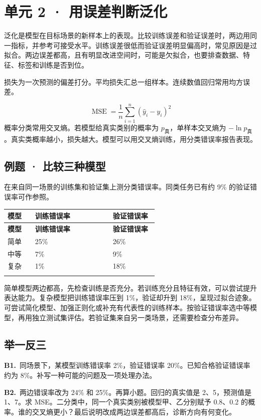 \documentclass[UTF8,a4paper,11pt]{ctexart}
\newcommand{\CompactQuestion}[2]{\par\noindent\textbf{#1.}\ #2\par\vspace{.8em}}
\begin{document}
\section{单元 2 · 用误差判断泛化}
泛化是模型在目标场景的新样本上的表现。比较训练误差和验证误差时，两边用同一指标，并参考可接受水平。训练误差很低而验证误差明显偏高时，常见原因是过拟合。两边误差都高，且有明显改进空间时，可能是欠拟合，也要排查数据、特征、标签和训练是否到位。

损失为一次预测的偏差打分。平均损失汇总一组样本。连续数值回归常用均方误差。

\[\operatorname{MSE}=\frac{1}{n}\sum_{i=1}^n(\hat y_i-y_i)^2\]
概率分类常用交叉熵。若模型给真实类别的概率为 $p_{\text{真}}$，单样本交叉熵为 $-\ln p_{\text{真}}$。真实类概率越小，损失越大。模型可以用交叉熵训练，用分类错误率报告表现。

\subsection{例题 · 比较三种模型}
在来自同一场景的训练集和验证集上测分类错误率。同类任务已有约 9\% 的验证错误率可作参照。

{\small\renewcommand{\arraystretch}{1.38}\setlength{\tabcolsep}{3.5pt}
\begin{longtable}{P{0.17\linewidth}P{0.48\linewidth}P{0.28\linewidth}}
\toprule
\bfseries 模型 & \bfseries 训练错误率 & \bfseries 验证错误率 \\
\midrule
\endfirsthead
\toprule
\bfseries 模型 & \bfseries 训练错误率 & \bfseries 验证错误率 \\
\midrule
\endhead
简单 & 25\% & 26\% \\
\addlinespace[.35em]
中等 & 7\% & 9\% \\
\addlinespace[.35em]
复杂 & 1\% & 18\% \\
\addlinespace[.35em]
\bottomrule
\end{longtable}
}
简单模型两边都高，先检查训练是否充分。若训练充分且特征有效，可以尝试提升表达能力。复杂模型把训练错误率压到 1\%，验证却升到 18\%，呈现过拟合迹象。可尝试简化模型、加强正则化或补充有代表性的训练样本。按验证错误率选中等模型，再用独立测试集评估。若验证集来自另一类场景，还需要检查分布差异。

\subsection{举一反三}
\CompactQuestion{B1}{同场景下，某模型训练错误率 2\%，验证错误率 20\%。已知合格验证错误率约为 8\%。补写一种可能的问题及一项处理办法。}
\CompactQuestion{B2}{两边错误率改为 24\% 和 25\%。再算小题。回归的真实值是 2、5，预测值是 1、7。求 MSE。二分类中，同一个真实类别被模型甲、乙分别赋予 0.8、0.2 的概率。谁的交叉熵更小？最后说明改成两边误差都高后，诊断方向有何变化。}
\clearpage
\end{document}
